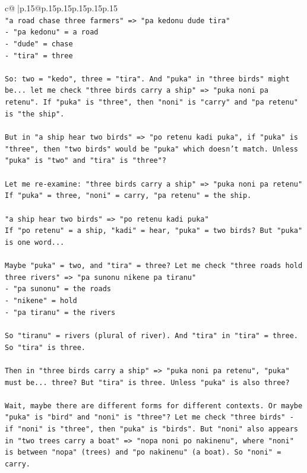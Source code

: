 \documentclass{article}
\begin{document}
{\begin{supertabular}{c@{$\;$}|p{.15\linewidth}@{}p{.15\linewidth}p{.15\linewidth}p{.15\linewidth}p{.15\linewidth}p{.15\linewidth}}
{{{\\ 
\texttt{"a road chase three farmers" => "pa kedonu dude tira"} \\
\texttt{{-} "pa kedonu" = a road} \\
\texttt{{-} "dude" = chase} \\
\texttt{{-} "tira" = three} \\
\\ 
\texttt{So: two = "kedo", three = "tira". And "puka" in "three birds" might be... let me check "three birds carry a ship" => "puka noni pa retenu". If "puka" is "three", then "noni" is "carry" and "pa retenu" is "the ship".} \\
\\ 
\texttt{But in "a ship hear two birds" => "po retenu kadi puka", if "puka" is "three", then "two birds" would be "puka" which doesn't match. Unless "puka" is "two" and "tira" is "three"?} \\
\\ 
\texttt{Let me re{-}examine: "three birds carry a ship" => "puka noni pa retenu"} \\
\texttt{If "puka" = three, "noni" = carry, "pa retenu" = the ship.} \\
\\ 
\texttt{"a ship hear two birds" => "po retenu kadi puka"} \\
\texttt{If "po retenu" = a ship, "kadi" = hear, "puka" = two birds? But "puka" is one word...} \\
\\ 
\texttt{Maybe "puka" = two, and "tira" = three? Let me check "three roads hold three rivers" => "pa sunonu nikene pa tiranu"} \\
\texttt{{-} "pa sunonu" = the roads} \\
\texttt{{-} "nikene" = hold} \\
\texttt{{-} "pa tiranu" = the rivers} \\
\\ 
\texttt{So "tiranu" = rivers (plural of river). And "tira" in "tira" = three. So "tira" is three.} \\
\\ 
\texttt{Then in "three birds carry a ship" => "puka noni pa retenu", "puka" must be... three? But "tira" is three. Unless "puka" is also three?} \\
\\ 
\texttt{Wait, maybe there are different forms for different contexts. Or maybe "puka" is "bird" and "noni" is "three"? Let me check "three birds" {-} if "noni" is "three", then "puka" is "birds". But "noni" also appears in "two trees carry a boat" => "nopa noni po nakinenu", where "noni" is between "nopa" (trees) and "po nakinenu" (a boat). So "noni" = carry.} \\
}}}
\end{supertabular}}
\end{document}
